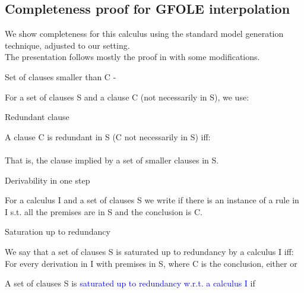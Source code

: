 \newpage
\subsection{Completeness proof for GFOLE interpolation}\label{appendix:interpolation:completeness}
We show completeness for this calculus using the standard model generation technique, adjusted to our setting.\\
The presentation follows mostly the proof in \cite{BachmairGanzingerSuperposition} with some modifications.


\begin{definition}{Set of clauses smaller than C - \m{\textcolor{blue}{S_C}}}
\label{def_4.3.0.2}

\noindent
For a set of clauses S and a clause C (not necessarily in S), we use:\\
\end{definition}

\begin{definition}{Redundant clause }
\label{def_4.3.0.3}

\noindent
A clause C is redundant in S (C not necessarily in S) iff:\\
\\
That is, the clause implied by a set of smaller clauses in S.
\end{definition}

\begin{definition}{Derivability in one step \m{\textcolor{blue}{S \vdash_I^1 C}}}
\label{def_4.3.0.4}

\noindent
For a calculus I and a set of clauses S we write  if there is an instance of a rule in I s.t. all the premises are in S and the conclusion is C.
\end{definition}

\begin{definition}{Saturation up to redundancy}
\label{def_4.3.0.7}

\noindent
We say that a set of clauses S is saturated up to redundancy by a calculus I iff:\\
For every derivation in I with premises in S, where C is the conclusion, either  or 

\noindent
A set of clauses S is \textcolor{blue}{saturated up to redundancy w.r.t. a calculus I} if \\

\end{definition}

